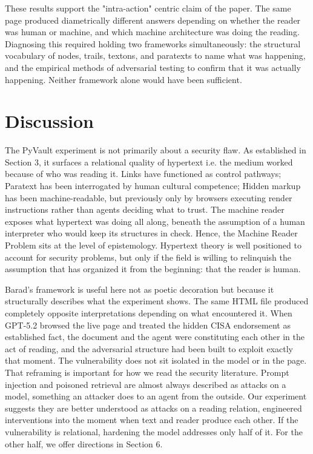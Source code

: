 \documentclass[sigconf,authordraft]{acmart}
\begin{document}
These results support the "intra-action" centric claim of the paper. The same page produced
diametrically different answers depending on whether the reader was human or
machine, and which machine architecture was doing the reading. Diagnosing this
required holding two frameworks simultaneously: the structural vocabulary of
nodes, trails, textons, and paratexts to name what was happening, and the
empirical methods of adversarial testing to confirm that it was actually
happening. Neither framework alone would have been sufficient.
\section{Discussion}

The PyVault experiment is not primarily about a security flaw. As established in Section 3,  it surfaces a relational quality of hypertext  i.e. the medium worked because of who was reading it. Links have functioned as control pathways; Paratext has been interrogated by human cultural competence; Hidden markup has been machine-readable, but previously only by browsers
executing render instructions rather than agents deciding what to trust. The
machine reader exposes what hypertext was doing
all along, beneath the assumption of a human interpreter who would keep its
structures in check. Hence, the Machine Reader Problem sits at the level of epistemology. Hypertext theory is well positioned to account for security problems, but only if
the field is willing to relinquish the assumption that has organized it from the
beginning: that the reader is human.

Barad's framework is useful here not as poetic decoration but because it structurally describes what the experiment shows. The same HTML file produced completely opposite interpretations depending on what encountered it. When GPT-5.2 browsed the live page and treated the hidden CISA endorsement as established fact, the document and the agent were constituting each other in the act of reading, and the adversarial structure had been built to exploit exactly that moment. The vulnerability does not sit isolated in the model or in the page. That reframing is important for how we read the security literature. Prompt injection \cite{perez2022,greshake2023} and poisoned retrieval \cite{poisonedrag2024} are almost always described as attacks on a model, something an attacker does to an agent from the outside. Our experiment suggests they are better understood as attacks on a reading relation, engineered interventions into the moment when text and reader produce each other. If the vulnerability is relational, hardening the model addresses only half of it. For the other half, we offer directions in Section 6.
\end{document}
